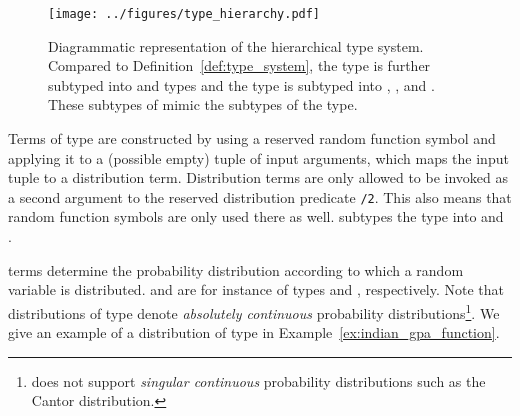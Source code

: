 \begin{figure}[t]
	\begin{center}
		\texttt{[image: ../figures/type\_hierarchy.pdf]}
	\end{center}
	\caption[Diagrammatic representation of the hierarchical \dcproblogsty type system.]{Diagrammatic representation of the hierarchical \dcproblogsty type system. Compared to Definition~\ref{def:type_system},  the  type is further subtyped into  and  types and the  type is subtyped into , , and . These subtypes of  mimic the subtypes of the  type.}
	\label{fig:type_system}
\end{figure}




\begin{definition}
	Terms of type  are constructed by using a reserved random function symbol and applying it to a (possible empty) tuple of input arguments, which maps the input tuple to a distribution term.
	Distribution terms are only allowed to be invoked as a second argument to the reserved distribution predicate \probloginline{~}\lstinline[columns=fixed]|/2|.
	This also means that random function symbols are only used there as well. \dcproblogsty subtypes the  type into  and .
\end{definition}

 terms determine the probability distribution according to which a random variable is distributed.
 and  are for instance of types  and  , respectively.
Note that distributions of type  denote {\em absolutely continuous} probability distributions\footnote{\dcproblogsty does not support {\em singular continuous} probability distributions such as the Cantor distribution.}.  We give an example of a distribution of type  in Example~\ref{ex:indian_gpa_function}.

